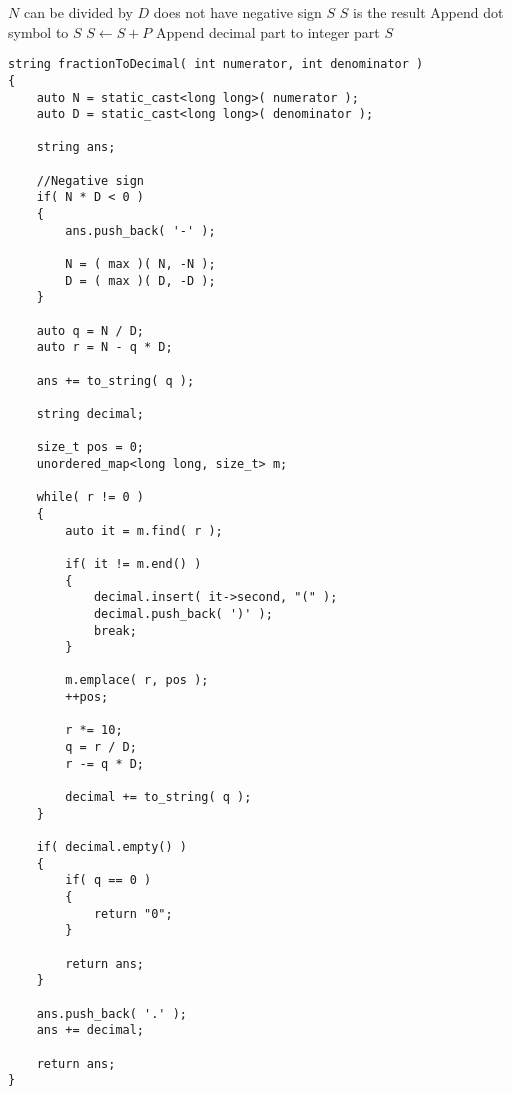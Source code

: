 \begin{algorithm}[H]
\begin{algorithmic}[1]
 \Comment $N$ can be divided by $D$
\State {}  does not have negative sign
\Else
\State \Return $S$ \Comment $S$ is the result
\EndIf
\EndIf
\State Append dot symbol to $S$
\State $S\gets S + P$ \Comment Append decimal part to integer part
\State \Return $S$
\EndProcedure
\end{algorithmic}
\end{algorithm}
\setcounter{lstlisting}{0}
\begin{lstlisting}[style=customc, caption={Source Code}]
string fractionToDecimal( int numerator, int denominator )
{
    auto N = static_cast<long long>( numerator );
    auto D = static_cast<long long>( denominator );

    string ans;

	//Negative sign
    if( N * D < 0 )
    {
        ans.push_back( '-' );

        N = ( max )( N, -N );
        D = ( max )( D, -D );
    }

    auto q = N / D;
    auto r = N - q * D;

    ans += to_string( q );

    string decimal;

    size_t pos = 0;
    unordered_map<long long, size_t> m;

    while( r != 0 )
    {
        auto it = m.find( r );

        if( it != m.end() )
        {
            decimal.insert( it->second, "(" );
            decimal.push_back( ')' );
            break;
        }

        m.emplace( r, pos );
        ++pos;

        r *= 10;
        q = r / D;
        r -= q * D;

        decimal += to_string( q );
    }

    if( decimal.empty() )
    {
        if( q == 0 )
        {
            return "0";
        }

        return ans;
    }

    ans.push_back( '.' );
    ans += decimal;

    return ans;
}
\end{lstlisting}